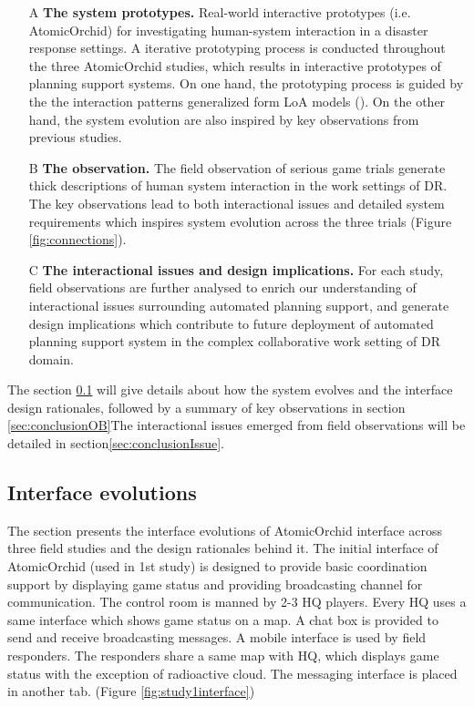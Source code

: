 \begin{enumerate}
  \item[A] \textbf{The system prototypes.} Real-world interactive prototypes (i.e. AtomicOrchid) for investigating human-system interaction in a disaster response settings. A iterative prototyping process is conducted throughout the three AtomicOrchid studies, which results in interactive prototypes of planning support systems. On one hand, the prototyping process is guided by the the interaction patterns generalized form LoA models (). On the other hand, the system evolution  are also inspired by key observations from previous studies. 
  
  \item[B] \textbf{The observation.} The field observation of serious game trials generate thick descriptions of human system interaction in the work settings of DR. The key observations lead to both interactional issues and detailed system requirements which inspires system evolution across the three trials (Figure \ref{fig:connections}).
  
  \item[C] \textbf{The interactional issues and design implications.} For each study, field observations are further analysed to enrich our understanding of interactional issues surrounding automated planning support, and generate design implications which contribute to future deployment of automated planning support system in the complex collaborative work setting of DR domain. 
\end{enumerate}

The section \ref{sec:conclusionIE}  will give details about how the system evolves and the interface design rationales, followed by a summary of key observations in section \ref{sec:conclusionOB}The interactional issues emerged from field observations will be detailed in section\ref{sec:conclusionIssue}. \\



\subsection{Interface evolutions}\label{sec:conclusionIE}
The section presents the interface evolutions of AtomicOrchid interface across three field studies and the design rationales behind it. The initial interface of AtomicOrchid (used in 1st study) is designed to provide basic coordination support by displaying game status and providing broadcasting channel for communication. The control room is manned by 2-3 HQ players. Every HQ uses a same interface which shows game status on a map. A chat box is provided to send and receive broadcasting messages. A mobile interface is used by field responders. The responders share a same map with HQ, which displays game status with the exception of radioactive cloud. The messaging interface is placed in another tab. (Figure \ref{fig:study1interface})\\ 


